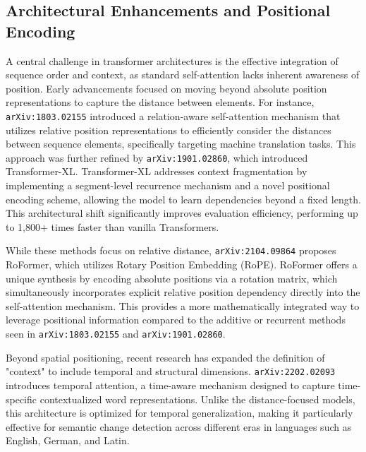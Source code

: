 \documentclass[11pt]{article}
\begin{document}
\subsection{Architectural Enhancements and Positional Encoding}

A central challenge in transformer architectures is the effective integration of sequence order and context, as standard self-attention lacks inherent awareness of position. Early advancements focused on moving beyond absolute position representations to capture the distance between elements. For instance, \texttt{arXiv:1803.02155} introduced a relation-aware self-attention mechanism that utilizes relative position representations to efficiently consider the distances between sequence elements, specifically targeting machine translation tasks. This approach was further refined by \texttt{arXiv:1901.02860}, which introduced Transformer-XL. Transformer-XL addresses context fragmentation by implementing a segment-level recurrence mechanism and a novel positional encoding scheme, allowing the model to learn dependencies beyond a fixed length. This architectural shift significantly improves evaluation efficiency, performing up to 1,800+ times faster than vanilla Transformers.

While these methods focus on relative distance, \texttt{arXiv:2104.09864} proposes RoFormer, which utilizes Rotary Position Embedding (RoPE). RoFormer offers a unique synthesis by encoding absolute positions via a rotation matrix, which simultaneously incorporates explicit relative position dependency directly into the self-attention mechanism. This provides a more mathematically integrated way to leverage positional information compared to the additive or recurrent methods seen in \texttt{arXiv:1803.02155} and \texttt{arXiv:1901.02860}.

Beyond spatial positioning, recent research has expanded the definition of "context" to include temporal and structural dimensions. \texttt{arXiv:2202.02093} introduces temporal attention, a time-aware mechanism designed to capture time-specific contextualized word representations. Unlike the distance-focused models, this architecture is optimized for temporal generalization, making it particularly effective for semantic change detection across different eras in languages such as English, German, and Latin.
\end{document}
